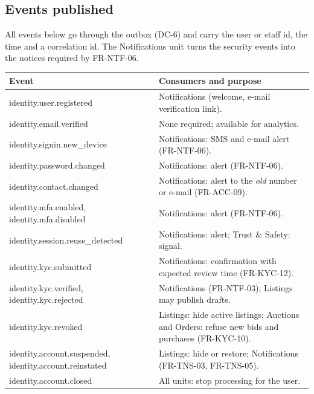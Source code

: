 \documentclass[11pt,a4paper]{article}
\newenvironment{dtable}[1]{\small\begin{longtable}{#1}}{\end{longtable}}
\begin{document}
\subsection{Events published}
All events below go through the outbox (DC-6) and carry the user or staff id, the time and a correlation id. The Notifications unit turns the security events into the notices required by FR-NTF-06.
\begin{dtable}{@{}>{\ttfamily}p{6.0cm}>{\raggedright\arraybackslash}p{9.2cm}@{}}
\toprule
\textnormal{\textbf{Event}} & \textbf{Consumers and purpose} \\ \midrule \endhead
identity.user.registered & Notifications (welcome, e-mail verification link). \\
identity.email.verified & None required; available for analytics. \\
identity.signin.new\_device & Notifications: SMS and e-mail alert (FR-NTF-06). \\
identity.password.changed & Notifications: alert (FR-NTF-06). \\
identity.contact.changed & Notifications: alert to the \emph{old} number or e-mail (FR-ACC-09). \\
identity.mfa.enabled, identity.mfa.disabled & Notifications: alert (FR-NTF-06). \\
identity.session.reuse\_detected & Notifications: alert; Trust \& Safety: signal. \\
identity.kyc.submitted & Notifications: confirmation with expected review time (FR-KYC-12). \\
identity.kyc.verified, identity.kyc.rejected & Notifications (FR-NTF-03); Listings may publish drafts. \\
identity.kyc.revoked & Listings: hide active listings; Auctions and Orders: refuse new bids and purchases (FR-KYC-10). \\
identity.account.suspended, identity.account.reinstated & Listings: hide or restore; Notifications (FR-TNS-03, FR-TNS-05). \\
identity.account.closed & All units: stop processing for the user. \\
\bottomrule
\end{dtable}
\end{document}
